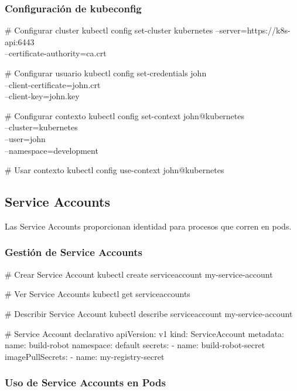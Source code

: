 \documentclass[11pt,a4paper]{article}
\begin{document}
\subsubsection{Configuración de kubeconfig}

\begin{commandbox}
\# Configurar cluster
kubectl config set-cluster kubernetes --server=https://k8s-api:6443 \\
  --certificate-authority=ca.crt

\# Configurar usuario
kubectl config set-credentials john \\
  --client-certificate=john.crt \\
  --client-key=john.key

\# Configurar contexto
kubectl config set-context john@kubernetes \\
  --cluster=kubernetes \\
  --user=john \\
  --namespace=development

\# Usar contexto
kubectl config use-context john@kubernetes
\end{commandbox}

\subsection{Service Accounts}

Las Service Accounts proporcionan identidad para procesos que corren en pods.

\subsubsection{Gestión de Service Accounts}

\begin{commandbox}
\# Crear Service Account
kubectl create serviceaccount my-service-account

\# Ver Service Accounts
kubectl get serviceaccounts

\# Describir Service Account
kubectl describe serviceaccount my-service-account

\# Service Account declarativo
apiVersion: v1
kind: ServiceAccount
metadata:
  name: build-robot
  namespace: default
secrets:
- name: build-robot-secret
imagePullSecrets:
- name: my-registry-secret
\end{commandbox}

\subsubsection{Uso de Service Accounts en Pods}
\end{document}
